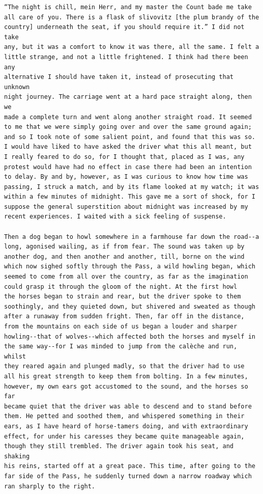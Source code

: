 \documentclass{article}
\begin{document}
\begin{verbatim}
“The night is chill, mein Herr, and my master the Count bade me take
all care of you. There is a flask of slivovitz [the plum brandy of the
country] underneath the seat, if you should require it.” I did not take
any, but it was a comfort to know it was there, all the same. I felt a
little strange, and not a little frightened. I think had there been any
alternative I should have taken it, instead of prosecuting that unknown
night journey. The carriage went at a hard pace straight along, then we
made a complete turn and went along another straight road. It seemed
to me that we were simply going over and over the same ground again;
and so I took note of some salient point, and found that this was so.
I would have liked to have asked the driver what this all meant, but
I really feared to do so, for I thought that, placed as I was, any
protest would have had no effect in case there had been an intention
to delay. By and by, however, as I was curious to know how time was
passing, I struck a match, and by its flame looked at my watch; it was
within a few minutes of midnight. This gave me a sort of shock, for I
suppose the general superstition about midnight was increased by my
recent experiences. I waited with a sick feeling of suspense.

Then a dog began to howl somewhere in a farmhouse far down the road--a
long, agonised wailing, as if from fear. The sound was taken up by
another dog, and then another and another, till, borne on the wind
which now sighed softly through the Pass, a wild howling began, which
seemed to come from all over the country, as far as the imagination
could grasp it through the gloom of the night. At the first howl
the horses began to strain and rear, but the driver spoke to them
soothingly, and they quieted down, but shivered and sweated as though
after a runaway from sudden fright. Then, far off in the distance,
from the mountains on each side of us began a louder and sharper
howling--that of wolves--which affected both the horses and myself in
the same way--for I was minded to jump from the calèche and run, whilst
they reared again and plunged madly, so that the driver had to use
all his great strength to keep them from bolting. In a few minutes,
however, my own ears got accustomed to the sound, and the horses so far
became quiet that the driver was able to descend and to stand before
them. He petted and soothed them, and whispered something in their
ears, as I have heard of horse-tamers doing, and with extraordinary
effect, for under his caresses they became quite manageable again,
though they still trembled. The driver again took his seat, and shaking
his reins, started off at a great pace. This time, after going to the
far side of the Pass, he suddenly turned down a narrow roadway which
ran sharply to the right.


\end{verbatim}
\end{document}
